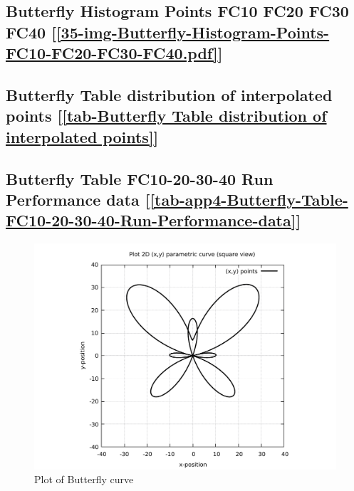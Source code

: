 \subsection       {Butterfly Histogram Points FC10 FC20 FC30 FC40
	[\ref      {35-img-Butterfly-Histogram-Points-FC10-FC20-FC30-FC40.pdf}] }
\label{ssec-35-img-Butterfly-Histogram-Points-FC10-FC20-FC30-FC40.pdf}

\subsection    {Butterfly Table distribution of interpolated points
	[\ref      {tab-Butterfly Table distribution of interpolated points}] }
\label{ssec-tab-Butterfly Table distribution of interpolated points}

\subsection         {Butterfly Table FC10-20-30-40 Run Performance data
	[\ref      {tab-app4-Butterfly-Table-FC10-20-30-40-Run-Performance-data}] }
\label{ssec-tab-app4-Butterfly-Table-FC10-20-30-40-Run-Performance-data}


\clearpage
\pagebreak

\begin{figure}
	\caption     {Plot of Butterfly curve}
	\label{01-img-Plot of Butterfly curve.pdf}
	\includegraphics[width=1.00\textwidth]{Chap4/appendix/app-Butterfly/plots/01-img-Plot of Butterfly curve.pdf}
\end{figure}	


